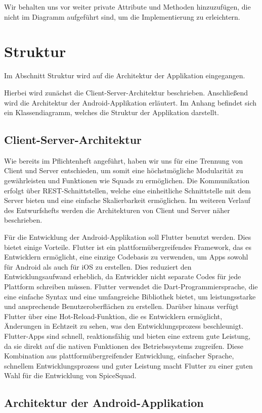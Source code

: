 \documentclass{entwurfsheft}
\begin{document}
\begin{sloppypar}
Wir behalten uns vor weiter private Attribute und Methoden hinzuzufügen, die nicht im Diagramm aufgeführt sind, um die Implementierung zu erleichtern.
\section{Struktur}
Im Abschnitt Struktur wird auf die Architektur der Applikation eingegangen.

Hierbei wird zunächst die Client-Server-Architektur beschrieben.
Anschließend wird die Architektur der Android-Applikation erläutert.
Im Anhang befindet sich ein Klassendiagramm, welches die Struktur der Applikation darstellt.

\subsection{Client-Server-Architektur}
Wie bereits im Pflichtenheft angeführt, haben wir uns für eine Trennung von Client und Server entschieden, um somit eine höchstmögliche Modularität zu gewährleisten und
Funktionen wie Squads zu ermöglichen. Die Kommunikation erfolgt über REST-Schnittstellen, welche eine einheitliche Schnittstelle mit dem Server bieten und eine einfache Skalierbarkeit ermöglichen.
Im weiteren Verlauf des Entwurfshefts werden die Architekturen von Client und Server näher beschrieben.

Für die Entwicklung der Android-Applikation soll Flutter benutzt werden. Dies bietet einige Vorteile. Flutter ist ein plattformübergreifendes Framework, das es Entwicklern ermöglicht, eine einzige Codebasis zu verwenden, um Apps sowohl für Android als auch für iOS zu erstellen. Dies reduziert den Entwicklungsaufwand erheblich, da Entwickler nicht separate Codes für jede Plattform schreiben müssen. Flutter verwendet die Dart-Programmiersprache, die eine einfache Syntax und eine umfangreiche Bibliothek bietet, um leistungsstarke und ansprechende Benutzeroberflächen zu erstellen. Darüber hinaus verfügt Flutter über eine Hot-Reload-Funktion, die es Entwicklern ermöglicht, Änderungen in Echtzeit zu sehen, was den Entwicklungsprozess beschleunigt. Flutter-Apps sind schnell, reaktionsfähig und bieten eine extrem gute Leistung, da sie direkt auf die nativen Funktionen des Betriebssystems zugreifen. Diese Kombination aus plattformübergreifender Entwicklung, einfacher Sprache, schnellem Entwicklungsprozess und guter Leistung macht Flutter zu einer guten Wahl für die Entwicklung von SpiceSquad.
\subsection{Architektur der Android-Applikation}



\end{sloppypar}
\end{document}
